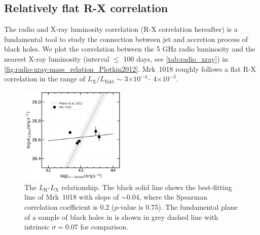 \subsection{Relatively flat R-X correlation}
The radio and X-ray luminosity correlation (R-X correlation hereafter) is a fundamental tool to study the connection between jet and accretion process of black holes. We plot the correlation between the 5 GHz radio luminosity and the nearest X-ray luminosity (interval $\le$ 100 days, see \autoref{tab:radio_xray}) in \autoref{fig:radio-xray-mass_relation_Plotkin2012}. Mrk~1018 roughly follows a flat R-X correlation in the range of $L_\mathrm{X}/L_\mathrm{Edd}$ $\sim$ 3$\times 10^{-4}$-- 4$\times 10^{-3}$.

\begin{figure}
\centering
	\includegraphics[width=0.45\textwidth]{./pic/Mrk1018_radio_xray_Plotkin2012_Lx.png}
    \caption{The $L_\mathrm{R}$-$L_\mathrm{X}$ relationship. The black solid line shows the best-fitting line of Mrk~1018 with slope of $\sim 0.04$, where the Spearman correlation coefficient is 0.2 ($p$-value is 0.75). The fundamental plane of a sample of black holes in \citet{2012MNRAS.419..267P} is shown in grey dashed line with intrinsic $\sigma=0.07$ for comparison.} 
    \label{fig:radio-xray-mass_relation_Plotkin2012}
\end{figure}